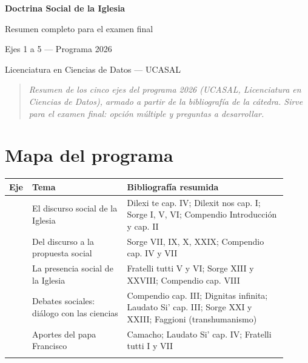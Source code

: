 \documentclass[10pt,a4paper]{article}
\begin{document}
\begin{titlepage}\centering\vspace*{5cm}
{\Huge\bfseries\sffamily\color{eje} Doctrina Social de la Iglesia\par}\vspace{0.8cm}
{\LARGE\sffamily Resumen completo para el examen final\par}\vspace{0.6cm}
{\large\sffamily Ejes 1 a 5 --- Programa 2026\par}\vspace{2cm}
{\large Licenciatura en Ciencias de Datos --- UCASAL\par}
\end{titlepage}
\tableofcontents

\begin{quote}\itshape Resumen de los cinco ejes del programa 2026 (UCASAL, Licenciatura en Ciencias de Datos), armado a partir de la bibliografía de la cátedra. Sirve para el examen final: opción múltiple y preguntas a desarrollar.\end{quote}

\clearpage\section{Mapa del programa}

{\small\renewcommand{\arraystretch}{1.25}
\begin{longtable}{>{\raggedright\arraybackslash}p{0.045\linewidth}>{\raggedright\arraybackslash}p{0.320\linewidth}>{\raggedright\arraybackslash}p{0.546\linewidth}}
\toprule
\textbf{Eje} & \textbf{Tema} & \textbf{Bibliografía resumida} \\ \midrule \endhead
1 & El discurso social de la Iglesia & Dilexi te cap. IV; Dilexit nos cap. I; Sorge I, V, VI; Compendio Introducción y cap. II \\ \addlinespace[2pt]
2 & Del discurso a la propuesta social & Sorge VII, IX, X, XXIX; Compendio cap. IV y VII \\ \addlinespace[2pt]
3 & La presencia social de la Iglesia & Fratelli tutti V y VI; Sorge XIII y XXVIII; Compendio cap. VIII \\ \addlinespace[2pt]
4 & Debates sociales: diálogo con las ciencias & Compendio cap. III; Dignitas infinita; Laudato Si' cap. III; Sorge XXI y XXIII; Faggioni (transhumanismo) \\ \addlinespace[2pt]
5 & Aportes del papa Francisco & Camacho; Laudato Si' cap. IV; Fratelli tutti I y VII \\ \addlinespace[2pt]
\bottomrule\end{longtable}}
\end{document}

